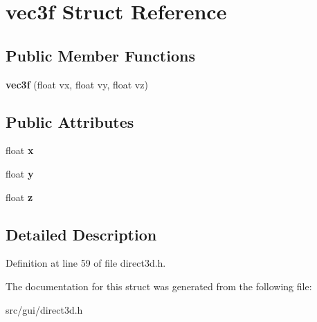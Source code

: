 \hypertarget{structvec3f}{\section{vec3f Struct Reference}
\label{structvec3f}
}
\subsection*{Public Member Functions}
\begin{DoxyCompactItemize}
\item 
\hypertarget{structvec3f_a308cf3b4bb1d3472c9f7e484d04393e0}{{\bfseries vec3f} (float vx, float vy, float vz)}\label{structvec3f_a308cf3b4bb1d3472c9f7e484d04393e0}

\end{DoxyCompactItemize}
\subsection*{Public Attributes}
\begin{DoxyCompactItemize}
\item 
\hypertarget{structvec3f_a1417f8559817da7ea82a53f83f671552}{float {\bfseries x}}\label{structvec3f_a1417f8559817da7ea82a53f83f671552}

\item 
\hypertarget{structvec3f_a9d9bd6e586efc6b2fdba9302e9414099}{float {\bfseries y}}\label{structvec3f_a9d9bd6e586efc6b2fdba9302e9414099}

\item 
\hypertarget{structvec3f_a6294514a5a4322c1c957a1f09972c756}{float {\bfseries z}}\label{structvec3f_a6294514a5a4322c1c957a1f09972c756}

\end{DoxyCompactItemize}


\subsection{Detailed Description}


Definition at line 59 of file direct3d.\-h.



The documentation for this struct was generated from the following file\-:\begin{DoxyCompactItemize}
\item 
src/gui/direct3d.\-h\end{DoxyCompactItemize}
